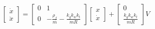 \documentclass[final]{scrreprt} %
\begin{document}
\begin{equation}
	\begin{bmatrix}
		\dot{x} \\
		\ddot{x}
	\end{bmatrix} =
	\begin{bmatrix}
		0 & 1 \\
		0 & -\frac{\rho_f}{m} - \frac{k_g k_w k_t}{mR}
	\end{bmatrix}
	\begin{bmatrix}
		x \\
		\dot{x}
	\end{bmatrix} +
	\begin{bmatrix}
		0 \\
		\frac{k_g k_w k_t}{mR}
	\end{bmatrix}
	V
	\label{eq:total_system_matrix}
\end{equation}
\end{document}
